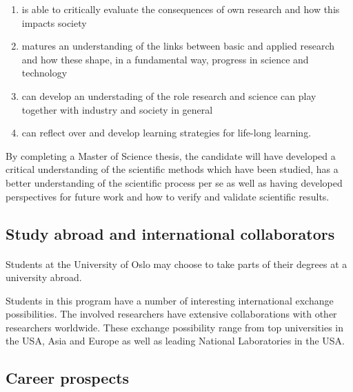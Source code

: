 \documentclass[%
oneside,                 %
final,                   %
10pt]{article}
\begin{document}
\begin{itemize}
\begin{itemize}
\begin{enumerate}
 \item is able to critically evaluate the consequences of own research and how this impacts society

 \item matures an understanding of the links between basic and applied research and how these shape, in a fundamental way,  progress in science and technology

 \item can develop an understading of the role research and science can play together with industry and society in general

 \item can reflect over and develop learning strategies for life-long learning.
\end{enumerate}

\noindent
\end{itemize}

\noindent
\end{itemize}

\noindent
By completing a Master of Science thesis, the candidate will have developed a critical understanding of the scientific methods which have been studied, has a better understanding of the scientific process per se as well as having developed perspectives for future work and how to verify and validate scientific results.

\subsection{Study abroad and international collaborators}


\paragraph{}

Students at the University of Oslo may choose to take parts of
their degrees at a university abroad.

Students in this program have a number of interesting international
exchange possibilities. The involved researchers have extensive
collaborations with other researchers worldwide. These exchange
possibility range from top universities in the USA, Asia and Europe as
well as leading National Laboratories in the USA.



\subsection{Career prospects}
\end{document}

